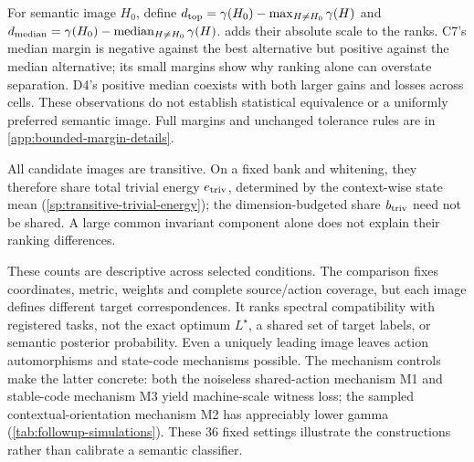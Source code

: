 \begin{table}[t]
\centering\small

\caption{Absolute spectral-budget margins at $r=16$ of the specified image against the strongest and median alternatives, excluding that image itself. Summaries use all \BoundedCellsPerDomain{} cells per domain. U/T/B counts unique leading, tied leading and behind under the original pairwise tolerance. Raw margins retain their signs; they are not permutation $p$-values, exact-action risk rankings or probabilities of semantic correctness.}
\label{tab:bounded-margins}
\end{table}
For semantic image $H_0$, define $d_{\rm top}=\gamma(H_0)-\max_{H\ne H_0}\gamma(H)$ and $d_{\rm median}=\gamma(H_0)-\operatorname{median}_{H\ne H_0}\gamma(H)$.  adds their absolute scale to the ranks. C7's median margin is negative against the best alternative but positive against the median alternative; its small margins show why ranking alone can overstate separation. D4's positive median coexists with both larger gains and losses across cells. These observations do not establish statistical equivalence or a uniformly preferred semantic image. Full margins and unchanged tolerance rules are in \cref{app:bounded-margin-details}.

All candidate images are transitive. On a fixed bank and whitening, they therefore share total trivial energy $e_{\rm triv}$, determined by the context-wise state mean (\cref{sp:transitive-trivial-energy}); the dimension-budgeted share $b_{\rm triv}$ need not be shared. A large common invariant component alone does not explain their ranking differences.

These counts are descriptive across selected conditions. The comparison fixes coordinates, metric, weights and complete source/action coverage, but each image defines different target correspondences. It ranks spectral compatibility with registered tasks, not the exact optimum $L^\star$, a shared set of target labels, or semantic posterior probability. Even a uniquely leading image leaves action automorphisms and state-code mechanisms possible. The mechanism controls make the latter concrete: both the noiseless shared-action mechanism M1 and stable-code mechanism M3 yield machine-scale witness loss; the sampled contextual-orientation mechanism M2 has appreciably lower gamma (\cref{tab:followup-simulations}). These 36 fixed settings illustrate the constructions rather than calibrate a semantic classifier.

